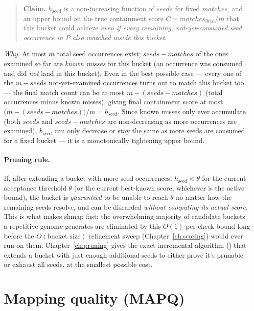 \begin{quote}
\textbf{Claim.} $h_{\mathrm{seed}}$ is a non-increasing function of $\mathit{seeds}$ for fixed
$\mathit{matches}$, and an upper bound on the true containment score
$C = \mathit{matches}_{\mathrm{final}} / m$ that this bucket could achieve \emph{even if every
remaining, not-yet-consumed seed occurrence in $P$ also matched inside this bucket}.
\end{quote}

\emph{Why.} At most $m$ total seed occurrences exist; $\mathit{seeds}-\mathit{matches}$ of the
ones examined so far are \emph{known misses} for this bucket (an occurrence was consumed and did
\emph{not} land in this bucket). Even in the best possible case --- every one of the
$m-\mathit{seeds}$ not-yet-examined occurrences turns out to match this bucket too --- the final
match count can be at most $m - (\mathit{seeds}-\mathit{matches})$ (total occurrences minus known
misses), giving final containment score at most
$\bigl(m-(\mathit{seeds}-\mathit{matches})\bigr)/m = h_{\mathrm{seed}}$. Since known misses only
ever accumulate (both $\mathit{seeds}$ and $\mathit{seeds}-\mathit{matches}$ are non-decreasing as
more occurrences are examined), $h_{\mathrm{seed}}$ can only decrease or stay the same as more
seeds are consumed for a fixed bucket --- it is a monotonically tightening upper bound.

\paragraph{Pruning rule.} If, after extending a bucket with more seed occurrences,
$h_{\mathrm{seed}} < \theta$ for the current acceptance threshold $\theta$ (or the current
best-known score, whichever is the active bound), the bucket is \emph{guaranteed} to be unable to
reach $\theta$ no matter how the remaining seeds resolve, and can be discarded \emph{without
computing its actual score}. This is what makes shmap fast: the overwhelming majority of
candidate buckets a repetitive genome generates are eliminated by this $O(1)$-per-check bound
long before the $O(\text{bucket size})$ refinement sweep (Chapter~\ref{ch:scoring}) would ever
run on them. Chapter~\ref{ch:pruning} gives the exact incremental algorithm
() that extends a bucket with just enough additional seeds to either
prove it's prunable or exhaust all seeds, at the smallest possible cost.

\section{Mapping quality (MAPQ)}
\label{sec:mapq-theory}

